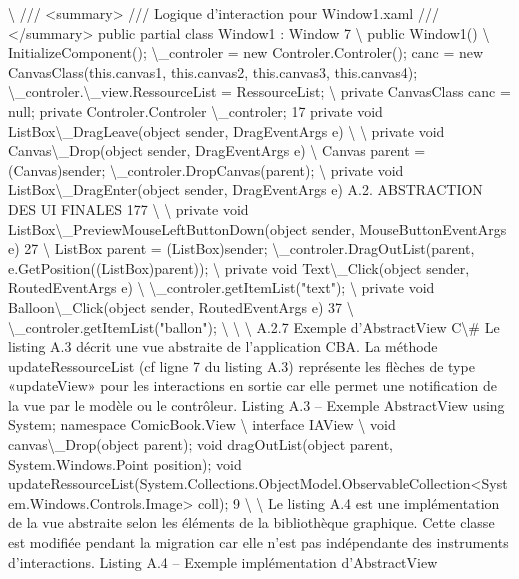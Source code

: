\documentclass{article}
\begin{document}
\textbackslash{}{
/// <summary>
/// Logique d’interaction pour Window1.xaml
/// </summary>
public partial class Window1 : Window
7
\textbackslash{}{
public Window1()
\textbackslash{}{
InitializeComponent();
\textbackslash{}_controler = new Controler.Controler();
canc = new CanvasClass(this.canvas1, this.canvas2, this.canvas3, this.canvas4);
\textbackslash{}_controler.\textbackslash{}_view.RessourceList = RessourceList;
\textbackslash{}}
private CanvasClass canc = null;
private Controler.Controler \textbackslash{}_controler;
17
private void ListBox\textbackslash{}_DragLeave(object sender, DragEventArgs e)
\textbackslash{}{ \textbackslash{}}
private void Canvas\textbackslash{}_Drop(object sender, DragEventArgs e)
\textbackslash{}{
Canvas parent = (Canvas)sender;
\textbackslash{}_controler.DropCanvas(parent);
\textbackslash{}}
private void ListBox\textbackslash{}_DragEnter(object sender, DragEventArgs e)
A.2. ABSTRACTION DES UI FINALES
177
\textbackslash{}{ \textbackslash{}}
private void ListBox\textbackslash{}_PreviewMouseLeftButtonDown(object sender, MouseButtonEventArgs e)
27
\textbackslash{}{
ListBox parent = (ListBox)sender;
\textbackslash{}_controler.DragOutList(parent, e.GetPosition((ListBox)parent));
\textbackslash{}}
private void Text\textbackslash{}_Click(object sender, RoutedEventArgs e)
\textbackslash{}{
\textbackslash{}_controler.getItemList("text");
\textbackslash{}}
private void Balloon\textbackslash{}_Click(object sender, RoutedEventArgs e)
37
\textbackslash{}{
\textbackslash{}_controler.getItemList("ballon");
\textbackslash{}}
\textbackslash{}}
\textbackslash{}}
A.2.7
Exemple d’AbstractView C\textbackslash{}#
Le listing A.3 d\'{e}crit une vue abstraite de l’application CBA. La m\'{e}thode updateRessourceList (cf
ligne 7 du listing A.3) repr\'{e}sente les ﬂ\`{e}ches de type «updateView» pour les interactions en sortie car
elle permet une notiﬁcation de la vue par le mod\`{e}le ou le contr\^{o}leur.
Listing A.3 – Exemple AbstractView
using System;
namespace ComicBook.View
\textbackslash{}{
interface IAView
\textbackslash{}{
void canvas\textbackslash{}_Drop(object parent);
void dragOutList(object parent, System.Windows.Point position);
void updateRessourceList(System.Collections.ObjectModel.ObservableCollection<System.Windows.Controls.Image> coll);
9
\textbackslash{}}
\textbackslash{}}
Le listing A.4 est une impl\'{e}mentation de la vue abstraite selon les \'{e}l\'{e}ments de la biblioth\`{e}que graphique. Cette classe est modiﬁ\'{e}e pendant la migration car elle n’est pas ind\'{e}pendante des instruments
d’interactions.
Listing A.4 – Exemple impl\'{e}mentation d’AbstractView
\end{document}
